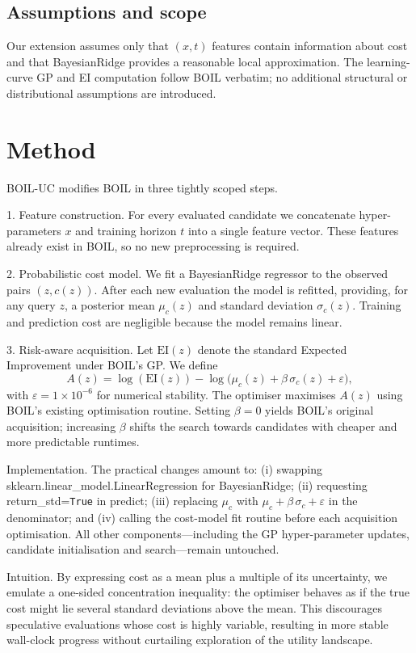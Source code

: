 \documentclass{article} %
\begin{document}
\subsection{Assumptions and scope}
Our extension assumes only that $(x, t)$ features contain information about cost and that BayesianRidge provides a reasonable local approximation. The learning-curve GP and EI computation follow BOIL verbatim; no additional structural or distributional assumptions are introduced.

\section{Method}
\label{sec:method}
BOIL-UC modifies BOIL in three tightly scoped steps.

1. Feature construction. For every evaluated candidate we concatenate hyper-parameters $x$ and training horizon $t$ into a single feature vector. These features already exist in BOIL, so no new preprocessing is required.

2. Probabilistic cost model. We fit a BayesianRidge regressor to the observed pairs $(z, c(z))$. After each new evaluation the model is refitted, providing, for any query $z$, a posterior mean $\mu_c(z)$ and standard deviation $\sigma_c(z)$. Training and prediction cost are negligible because the model remains linear.

3. Risk-aware acquisition. Let $\mathrm{EI}(z)$ denote the standard Expected Improvement under BOIL’s GP. We define
\[ A(z) = \log(\mathrm{EI}(z)) - \log\big( \mu_c(z) + \beta\,\sigma_c(z) + \varepsilon \big), \]
with $\varepsilon = 1\times 10^{-6}$ for numerical stability. The optimiser maximises $A(z)$ using BOIL’s existing optimisation routine. Setting $\beta=0$ yields BOIL’s original acquisition; increasing $\beta$ shifts the search towards candidates with cheaper and more predictable runtimes.

Implementation. The practical changes amount to: (i) swapping sklearn.linear\_model.LinearRegression for BayesianRidge; (ii) requesting return\_std=\texttt{True} in predict; (iii) replacing $\mu_c$ with $\mu_c + \beta\,\sigma_c + \varepsilon$ in the denominator; and (iv) calling the cost-model fit routine before each acquisition optimisation. All other components—including the GP hyper-parameter updates, candidate initialisation and search—remain untouched.

Intuition. By expressing cost as a mean plus a multiple of its uncertainty, we emulate a one-sided concentration inequality: the optimiser behaves as if the true cost might lie several standard deviations above the mean. This discourages speculative evaluations whose cost is highly variable, resulting in more stable wall-clock progress without curtailing exploration of the utility landscape.
\end{document}
